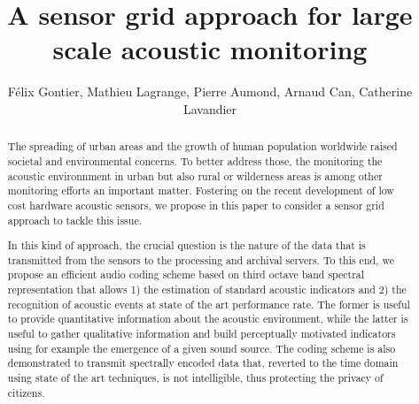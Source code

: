 \documentclass[final,3p,times,twocolumn]{elsarticle}
\begin{document}
\begin{frontmatter}




\title{A sensor grid approach for large scale acoustic monitoring}


\author{F\'elix Gontier, Mathieu Lagrange, Pierre Aumond, Arnaud Can, Catherine Lavandier}

\address{felix.gontier@reseau.eseo.fr}

\begin{abstract}

The spreading of urban areas and the growth of human population worldwide raised societal and environmental concerns. To better address those, the monitoring the acoustic environnment in urban but also rural or wilderness areas is among other monitoring efforts an important matter. Fostering on the recent development of low cost hardware acoustic sensors, we propose in this paper to consider a sensor grid approach to tackle this issue.

In this kind of approach, the crucial question is the nature of the data that is transmitted from the sensors to the processing and archival servers. To this end, we propose an efficient audio coding scheme based on third octave band spectral representation that allows 1) the estimation of standard acoustic indicators and 2) the recognition of acoustic events at state of the art performance rate. The former is useful to provide quantitative information about the acoustic environment, while the latter is useful to gather qualitative information and build perceptually motivated indicators using for example the emergence of a given sound source. The coding scheme is also demonstrated to transmit spectrally encoded data that, reverted to the time domain using state of the art techniques, is not intelligible, thus protecting the privacy of citizens.


\end{abstract}
\end{frontmatter}
\end{document}
